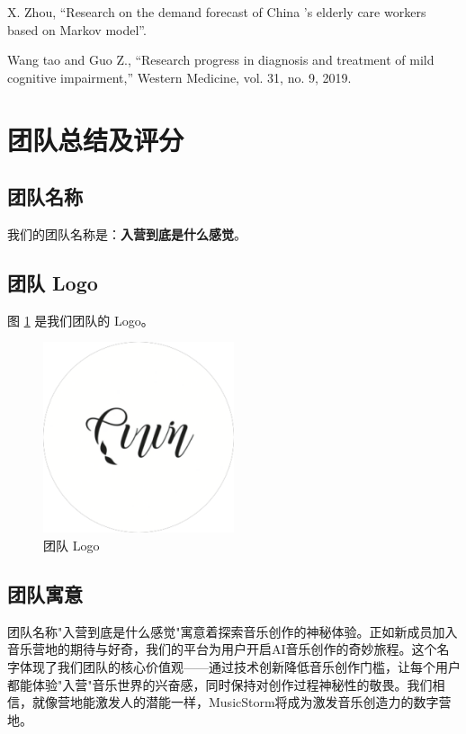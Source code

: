 \documentclass{base}
\numberwithin{figure}{section} %
\begin{document}
\noindent[13] X. Zhou, “Research on the demand forecast of China ’s elderly care workers based on Markov model”.

\noindent[14] Wang  tao and Guo Z., “Research progress in diagnosis and treatment of mild cognitive impairment,” Western Medicine, vol. 31, no. 9, 2019.

\newpage
\section{团队总结及评分}

\subsection{团队名称}

我们的团队名称是：\textbf{入营到底是什么感觉}。

\subsection{团队 Logo}

图 \ref{fig:team-logo} 是我们团队的 Logo。

\begin{figure}[H]
    \centering
    \includegraphics[width=0.5\textwidth]{images/9-1.png}
    \caption{团队 Logo}
    \label{fig:team-logo}
\end{figure}

\subsection{团队寓意}

团队名称"入营到底是什么感觉"寓意着探索音乐创作的神秘体验。正如新成员加入音乐营地的期待与好奇，我们的平台为用户开启AI音乐创作的奇妙旅程。这个名字体现了我们团队的核心价值观——通过技术创新降低音乐创作门槛，让每个用户都能体验"入营"音乐世界的兴奋感，同时保持对创作过程神秘性的敬畏。我们相信，就像营地能激发人的潜能一样，MusicStorm将成为激发音乐创造力的数字营地。
\end{document}
